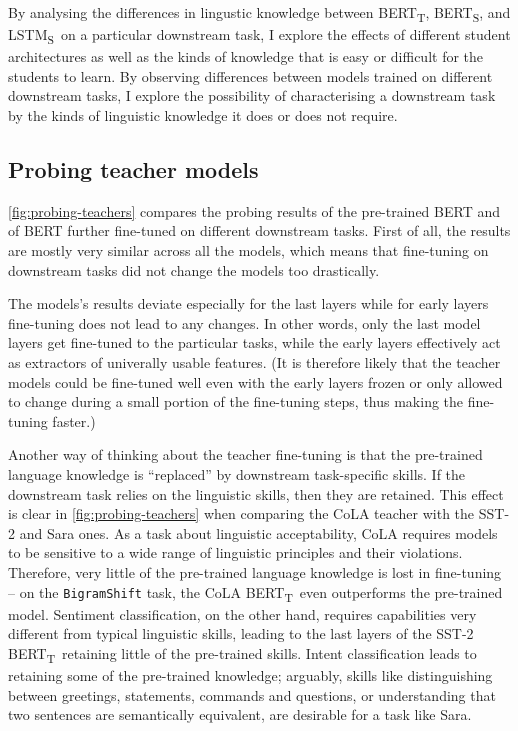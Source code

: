 \documentclass[bsc,frontabs,twoside,singlespacing,parskip,deptreport]{infthesis}
\def\BERTT{BERT\textsubscript{T}}
\def\BERTS{BERT\textsubscript{S}}
\def\LSTMS{LSTM\textsubscript{S}}
\begin{document}
{{    %
    By analysing the differences in lingustic knowledge between \BERTT, \BERTS, and \LSTMS~on a particular downstream task, I explore the effects of different student architectures as well as the kinds of knowledge that is easy or difficult for the students to learn.
    By observing differences between models trained on different downstream tasks, I explore the possibility of characterising a downstream task by the kinds of linguistic knowledge it does or does not require.

    \subsection{Probing teacher models}{
      \autoref{fig:probing-teachers} compares the probing results of the pre-trained BERT and of BERT further fine-tuned on different downstream tasks.
      First of all, the results are mostly very similar across all the models, which means that fine-tuning on downstream tasks did not change the models too drastically.

      The models's results deviate especially for the last layers while for early layers fine-tuning does not lead to any changes. In other words, only the last model layers get fine-tuned to the particular tasks, while the early layers effectively act as extractors of univerally usable features. (It is therefore likely that the teacher models could be fine-tuned well even with the early layers frozen or only allowed to change during a small portion of the fine-tuning steps, thus making the fine-tuning faster.)

      Another way of thinking about the teacher fine-tuning is that the pre-trained language knowledge is ``replaced'' by downstream task-specific skills. If the downstream task relies on the linguistic skills, then they are retained.
      This effect is clear in \autoref{fig:probing-teachers} when comparing the CoLA teacher with the SST-2 and Sara ones. As a task about linguistic acceptability, CoLA requires models to be sensitive to a wide range of linguistic principles and their violations. Therefore, very little of the pre-trained language knowledge is lost in fine-tuning -- on the \verb|BigramShift| task, the CoLA \BERTT~even outperforms the pre-trained model. Sentiment classification, on the other hand, requires capabilities very different from typical linguistic skills, leading to the last layers of the SST-2 \BERTT~retaining little of the pre-trained skills. Intent classification leads to retaining some of the pre-trained knowledge; arguably, skills like distinguishing between greetings, statements, commands and questions, or understanding that two sentences are semantically equivalent, are desirable for a task like Sara.

}}}
\end{document}
